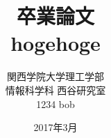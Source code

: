 \title{卒業論文\\hogehoge}
\author{関西学院大学理工学部\\情報科学科 西谷研究室\\1234 bob}
\date{2017年3月}

\maketitle
\newpage
